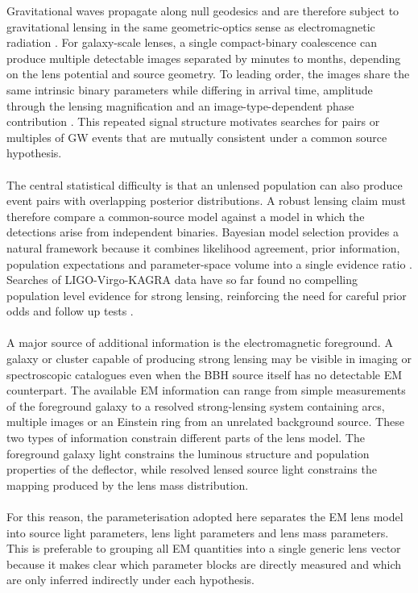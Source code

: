 \documentclass[pdflatex,sn-mathphys-num]{sn-jnl}%
\theoremstyle{thmstyleone}%
\theoremstyle{thmstyletwo}%
\theoremstyle{thmstylethree}%
\begin{document}
Gravitational waves propagate along null geodesics and are therefore subject to gravitational lensing in the same geometric-optics sense as electromagnetic radiation \cite{2}\cite{1}. 
For galaxy-scale lenses, a single compact-binary coalescence can produce multiple detectable images separated by minutes to months, depending on the lens potential and source geometry.
To leading order, the images share the same intrinsic binary parameters while differing in arrival time, amplitude through the lensing magnification and an image-type-dependent phase contribution \cite{6}\cite{3}\cite{4}\cite{5}.
This repeated signal structure motivates searches for pairs or multiples of GW events that are mutually consistent under a common source hypothesis.\\
\\The central statistical difficulty is that an unlensed population can also produce event pairs with overlapping posterior distributions. 
A robust lensing claim must therefore compare a common-source model against a model in which the detections arise from independent binaries.
Bayesian model selection provides a natural framework because it combines likelihood agreement, prior information, population expectations and parameter-space volume into a single evidence ratio \cite{7}\cite{8}\cite{9}\cite{10}.
Searches of LIGO-Virgo-KAGRA data have so far found no compelling population level evidence for strong lensing, reinforcing the need for careful prior odds and follow up tests \cite{12}\cite{13}\cite{14}.\\
\\A major source of additional information is the electromagnetic foreground. 
A galaxy or cluster capable of producing strong lensing may be visible in imaging or spectroscopic catalogues even when the BBH source itself has no detectable EM counterpart.
The available EM information can range from simple measurements of the foreground galaxy to a resolved strong-lensing system containing arcs, multiple images or an Einstein ring from an unrelated background source.
These two types of information constrain different parts of the lens model.
The foreground galaxy light constrains the luminous structure and population properties of the deflector, while resolved lensed source light constrains the mapping produced by the lens mass distribution.\\
\\For this reason, the parameterisation adopted here separates the EM lens model into source light parameters, lens light parameters and lens mass parameters.
This is preferable to grouping all EM quantities into a single generic lens vector because it makes clear which parameter blocks are directly measured and which are only inferred indirectly under each hypothesis.
\end{document}
